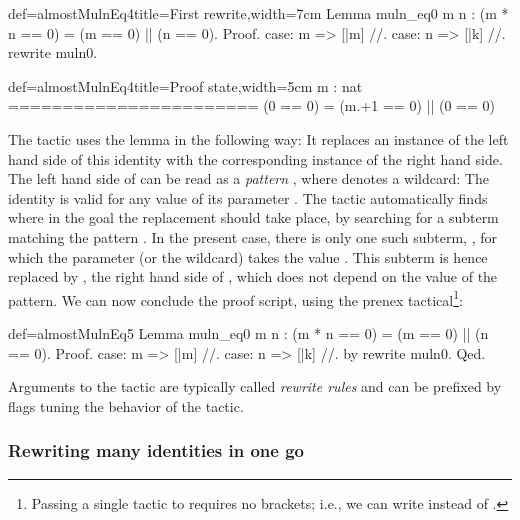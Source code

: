 \begin{coq}{def=almostMulnEq4}{title=First rewrite,width=7cm}
Lemma muln_eq0 m n :
  (m * n == 0) = (m == 0) || (n == 0).
Proof.
case: m => [|m] //.
case: n => [|k] //.
rewrite muln0.
\end{coq}
\begin{coqout}{def=almostMulnEq4}{title=Proof state,width=5cm}
m : nat
=======================
(0 == 0) =
  (m.+1 == 0) || (0 == 0)
\end{coqout}

The  tactic uses the  lemma in the following way:
It replaces an instance of the left hand side of this identity with the
corresponding instance of the right hand side. The left hand side of
 can be read as a \emph{pattern} , where \C{_}
denotes a wildcard: The identity is
valid for any value of its parameter . The tactic
automatically  finds  where in the goal the replacement should take
place, by searching for a subterm matching the pattern .
In the present case, there is only one such subterm,
, for which the parameter (or the wildcard) takes the
value . This subterm is hence replaced by , the right
hand side of , which does not depend on the value of the
pattern. We can now conclude the proof script, using the
prenex  tactical\footnote{Passing a single tactic to
 requires no brackets; i.e., we can write
 instead of .}:

\begin{coq}{def=almostMulnEq5}{}
Lemma muln_eq0 m n : (m * n == 0) = (m == 0) || (n == 0).
Proof.
case: m => [|m] //.
case: n => [|k] //.
by rewrite muln0.
Qed.
\end{coq}

Arguments to the  tactic are typically called
\emph{rewrite rules} and can
be prefixed by flags tuning the behavior of the tactic.


\subsubsection{Rewriting many identities in one go}
\label{sec:multirew}

